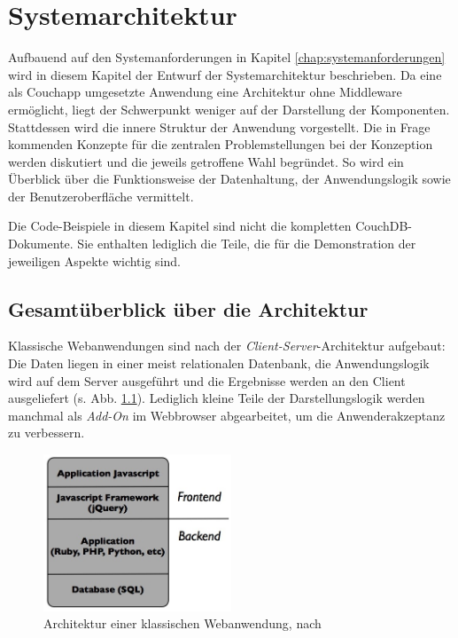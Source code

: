 \chapter{Systemarchitektur}
\label{chap:systemarchitektur}

Aufbauend auf den Systemanforderungen in Kapitel \ref{chap:systemanforderungen} wird in diesem Kapitel der Entwurf der Systemarchitektur beschrieben. Da eine als Couchapp umgesetzte Anwendung eine Architektur ohne Middleware ermöglicht, liegt der Schwerpunkt weniger auf der Darstellung der Komponenten. Stattdessen wird die innere Struktur der Anwendung vorgestellt. Die in Frage kommenden Konzepte für die zentralen Problemstellungen bei der Konzeption werden diskutiert und die jeweils getroffene Wahl begründet. So wird ein Überblick über die Funktionsweise der Datenhaltung, der Anwendungslogik sowie der Benutzeroberfläche vermittelt.

Die Code-Beispiele in diesem Kapitel sind nicht die kompletten CouchDB-Dokumente. Sie enthalten lediglich die Teile, die für die Demonstration der jeweiligen Aspekte wichtig sind.



\section{Gesamtüberblick über die Architektur}

Klassische Webanwendungen sind nach der \textit{Client-Server}-Architektur aufgebaut: Die Daten liegen in einer meist relationalen Datenbank, die Anwendungslogik wird auf dem Server ausgeführt und die Ergebnisse werden an den Client ausgeliefert (s. Abb. \ref{fig:old-web-arch}). Lediglich kleine Teile der Darstellungslogik werden manchmal als \textit{Add-On} im Webbrowser abgearbeitet, um die Anwenderakzeptanz zu verbessern.


\medskip
\begin{figure}[ht] 
  \begin{center}
    \includegraphics[width=0.5\textwidth]{grafik/old-application-architecture} 
  \end{center}
\caption{Architektur einer klassischen Webanwendung, nach \cite{web:architecture}}
\label{fig:old-web-arch} 
\end{figure}


